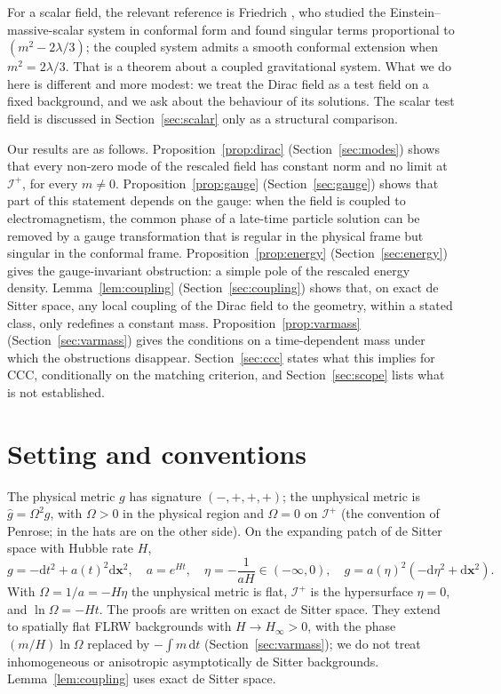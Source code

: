 \documentclass[11pt,a4paper]{article}
\theoremstyle{definition}
\newcommand{\scri}{\mathscr{I}^{+}}
\newcommand{\dd}{\mathrm{d}}
\newcommand{\hg}{\hat g}
\begin{document}
For a scalar field, the relevant reference is Friedrich \cite{Friedrich2014}, who studied the Einstein--massive-scalar system in conformal form and found singular terms proportional to $(m^{2}-2\lambda/3)$; the coupled system admits a smooth conformal extension when $m^{2}=2\lambda/3$. That is a theorem about a coupled gravitational system. What we do here is different and more modest: we treat the Dirac field as a test field on a fixed background, and we ask about the behaviour of its solutions. The scalar test field is discussed in Section~\ref{sec:scalar} only as a structural comparison.

Our results are as follows. Proposition~\ref{prop:dirac} (Section~\ref{sec:modes}) shows that every non-zero mode of the rescaled field has constant norm and no limit at $\scri$, for every $m\neq0$. Proposition~\ref{prop:gauge} (Section~\ref{sec:gauge}) shows that part of this statement depends on the gauge: when the field is coupled to electromagnetism, the common phase of a late-time particle solution can be removed by a gauge transformation that is regular in the physical frame but singular in the conformal frame. Proposition~\ref{prop:energy} (Section~\ref{sec:energy}) gives the gauge-invariant obstruction: a simple pole of the rescaled energy density. Lemma~\ref{lem:coupling} (Section~\ref{sec:coupling}) shows that, on exact de Sitter space, any local coupling of the Dirac field to the geometry, within a stated class, only redefines a constant mass. Proposition~\ref{prop:varmass} (Section~\ref{sec:varmass}) gives the conditions on a time-dependent mass under which the obstructions disappear. Section~\ref{sec:ccc} states what this implies for CCC, conditionally on the matching criterion, and Section~\ref{sec:scope} lists what is not established.

\section{Setting and conventions}
\label{sec:setting}

The physical metric $g$ has signature $(-,+,+,+)$; the unphysical metric is $\hg=\Omega^{2}g$, with $\Omega>0$ in the physical region and $\Omega=0$ on $\scri$ (the convention of Penrose; in \cite{Friedrich2014} the hats are on the other side). On the expanding patch of de Sitter space with Hubble rate $H$,
\begin{equation}
g=-\dd t^{2}+a(t)^{2}\dd\mathbf{x}^{2},\quad a=e^{Ht},\quad \eta=-\frac{1}{aH}\in(-\infty,0),\quad g=a(\eta)^{2}(-\dd\eta^{2}+\dd\mathbf{x}^{2}).
\end{equation}
With $\Omega=1/a=-H\eta$ the unphysical metric is flat, $\scri$ is the hypersurface $\eta=0$, and $\ln\Omega=-Ht$. The proofs are written on exact de Sitter space. They extend to spatially flat FLRW backgrounds with $H\to H_{\infty}>0$, with the phase $(m/H)\ln\Omega$ replaced by $-\int m\,\dd t$ (Section~\ref{sec:varmass}); we do not treat inhomogeneous or anisotropic asymptotically de Sitter backgrounds. Lemma~\ref{lem:coupling} uses exact de Sitter space.
\end{document}
